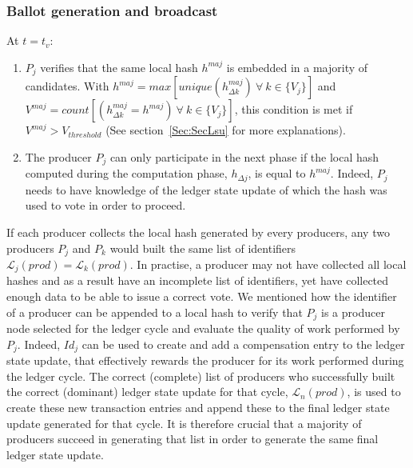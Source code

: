 \subsubsection{Ballot generation and broadcast}
At $t = t_v$:
\begin{enumerate}
\item $P_j$ verifies that the same local hash $h^{maj}$ is embedded in a majority of candidates. With $h^{maj} = max[unique(h^{maj}_{\Delta k})~\forall~k\in\{V_j\}]$ and $V^{maj} = count[(h^{maj}_{\Delta k} = h^{maj})~\forall~k\in\{V_j\}]$, this condition is met if $V^{maj}  > V_{threshold}$ (See section~\ref{Sec:SecLsu} for more explanations). 
\item The producer $P_j$ can only participate in the next phase if the local hash computed during the computation phase, $h_{\Delta j}$, is equal to $h^{maj}$. Indeed, $P_j$ needs to have knowledge of the ledger state update of which the hash was used to vote in order to proceed. 
\end{enumerate}
 
If each producer collects the local hash generated by every producers, any two producers $P_j$ and $P_k$ would built the same list of identifiers $\mathcal{L}_j(prod) = \mathcal{L}_k(prod)$. In practise, a producer may not have collected all local hashes and as a result have an incomplete list of identifiers, yet have collected enough data to be able to issue a correct vote. We mentioned how the identifier of a producer can be appended to a local hash to verify that $P_j$ is a producer node selected for the ledger cycle and evaluate the quality of work performed by $P_j$. Indeed, $Id_j$ can be used to create and add a compensation entry to the ledger state update, that effectively rewards the producer for its work performed during the ledger cycle. The correct (complete) list of producers who successfully built the correct (dominant) ledger state update for that cycle, $\mathcal{L}_n(prod)$,  is used to create these new transaction entries and append these to the final ledger state update generated for that cycle. It is therefore crucial that a majority of producers succeed in generating that list in order to generate the same final ledger state update. \\ 



